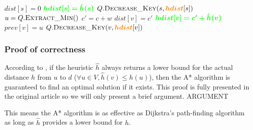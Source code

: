 \documentclass{report}[a4paper]
\theoremstyle{remark}
\begin{document}
\begin{center}
\begin{algorithm}[H]
\begin{minipage}[t]{0.49\linewidth}
\begin{algorithmic}[1]
                    \State $dist[s] = 0$
                    \State $\textcolor{green}{\bm{hdist[s] = \hat{h}(s)}}$
                    \State $Q.\Call{Decrease\_Key}{s, \textcolor{orange}{\bm{hdist}}[s]}$
                        \State $u = Q.\Call{Extract\_Min}{ }$
                            \State $c' = c + w$
                                \State $dist[v] = c'$
                                \State $\textcolor{green}{\bm{hdist[v] = c'+\hat{h}(v)}}$
                                \State $prev[v] = u$
                                \State $Q.\Call{Decrease\_Key}{v, \textcolor{orange}{\bm{hdist}}[v]}$
                            \EndIf
                        \EndFor
                    \EndWhile
                    \State {}
                \EndFunction
            \end{algorithmic}
        \end{minipage}
    \end{algorithm}
\end{center}
\subsubsection{Proof of correctness}
According to \cite{Astar}, if the heuristic $\hat{h}$ always returns a lower bound for the actual distance $h$ from $u$ to $d$ ($\forall u \in V, \hat{h}(v) \leq h(u)$), then the A* algorithm is guaranteed to find an optimal solution if it exists. This proof is fully presented in the original article so we will only present a brief argument. ARGUMENT\par
This means the A* algorithm is as effective as Dijkstra's path-finding algorithm as long as $\hat{h}$ provides a lower bound for $h$.
\end{document}
